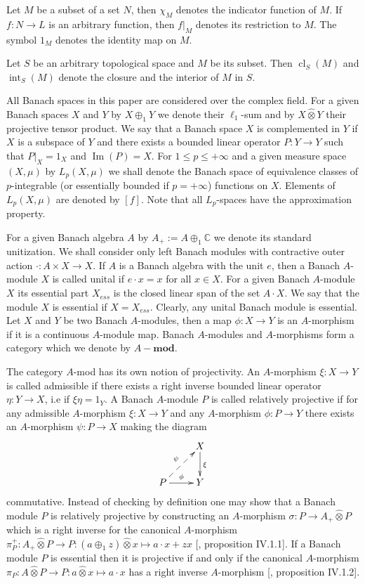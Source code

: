 \documentclass[12pt]{article}
\newcommand{\projtens}{\mathbin{\widehat{\otimes}}}
\begin{document}
Let $M$ be a subset of a set $N$, then $\chi_M$ denotes the indicator function
of $M$. If $f:N\to L$ is an arbitrary function, then $f|_M$ denotes its
restriction to $M$. The symbol $1_M$ denotes the identity map on $M$.

Let $S$ be an arbitrary topological space and $M$ be its subset. Then
$\operatorname{cl}_S(M)$ and $\operatorname{int}_S(M)$ denote the closure and
the interior of $M$ in $S$.

All Banach spaces in this paper are considered over the complex field. For a
given Banach spaces $X$ and $Y$ by $X\oplus_1 Y$ we denote their $\ell_1$-sum
and by $X\projtens Y$ their projective tensor product. We say that a Banach
space $X$ is complemented in $Y$ if $X$ is a subspace of $Y$ and there exists a
bounded linear operator $P:Y\to Y$ such that $P|_X=1_X$ and
$\operatorname{Im}(P)=X$. For $1\leq p\leq +\infty$ and a given measure space
$(X,\mu)$ by $L_p(X,\mu)$ we shall denote the Banach space of equivalence
classes of $p$-integrable (or essentially bounded if $p=+\infty$) functions on
$X$. Elements of $L_p(X,\mu)$ are denoted by $[f]$. Note that all $L_p$-spaces
have the approximation property.

For a given Banach algebra $A$ by $A_+:=A\oplus_1 \mathbb{C}$ we denote its
standard unitization. We shall consider only left Banach modules with
contractive outer action $\cdot:A\times X\to X$. If $A$ is a Banach algebra with
the unit $e$, then a Banach $A$-module $X$ is called unital if $e\cdot x=x$ for
all $x\in X$. For a given Banach $A$-module $X$ its essential part $X_{ess}$ is
the closed linear span of the set $A\cdot X$. We say that the module $X$ is
essential if $X=X_{ess}$. Clearly, any unital Banach module is essential. Let
$X$ and $Y$ be two Banach $A$-modules, then a map $\phi:X\to Y$ is an
$A$-morphism if it is a continuous $A$-module map. Banach $A$-modules and
$A$-morphisms form a category which we denote by $A-\mathbf{mod}$.

The category $A$-mod has its own notion of projectivity. An $A$-morphism
$\xi:X\to Y$ is called admissible if there exists a right inverse bounded linear
operator $\eta:Y\to X$, i.e if $\xi\eta=1_Y$. A Banach $A$-module $P$ is called
relatively projective if for any admissible $A$-morphism $\xi:X\to Y$ and any
$A$-morphism $\phi:P\to Y$ there exists an $A$-morphism $\psi:P\to X$ making the
diagram
$$
    \xymatrix{
    & {X} \ar[d]^{\xi}\\  %
    {P} \ar@{-->}[ur]^{\psi} \ar[r]^{\phi} &{Y}}  %
$$
commutative. Instead of checking by definition one may show that a Banach module
$P$ is relatively projective by constructing an $A$-morphism $\sigma:P\to
    A_+\projtens P$ which is a right inverse for the canonical $A$-morphism
$\pi_P^+:A_+\projtens P\to P:(a\oplus_1 z)\projtens x\mapsto a\cdot x+z x$
[\cite{HelHomolBanTopAlg}, proposition IV.1.1]. If a Banach module $P$ is
essential then it is projective if and only if the canonical $A$-morphism
$\pi_P:A\projtens P\to P: a\projtens x\mapsto a\cdot x$ has a right inverse
$A$-morphism [\cite{HelHomolBanTopAlg}, proposition IV.1.2].
\end{document}

